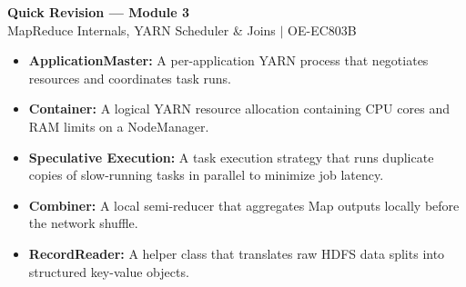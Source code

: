 \documentclass[12pt,a4paper]{article}
\begin{document}
\begin{center}
  {\large\bfseries\color{myred} Quick Revision --- Module 3}\\[3pt]
  {\small\color{mydark} MapReduce Internals, YARN Scheduler \& Joins $|$ OE-EC803B}
\end{center}
\noindent{\color{myred}\rule{\linewidth}{1.2pt}}
\vspace{8pt}

\begin{tcolorbox}[defbox, title={\textbf{One-Line Definitions}}]
\begin{itemize}[leftmargin=*, itemsep=3pt, topsep=0pt]
  \item \textbf{ApplicationMaster:} A per-application YARN process that negotiates resources and coordinates task runs.
  \item \textbf{Container:} A logical YARN resource allocation containing CPU cores and RAM limits on a NodeManager.
  \item \textbf{Speculative Execution:} A task execution strategy that runs duplicate copies of slow-running tasks in parallel to minimize job latency.
  \item \textbf{Combiner:} A local semi-reducer that aggregates Map outputs locally before the network shuffle.
  \item \textbf{RecordReader:} A helper class that translates raw HDFS data splits into structured key-value objects.
\end{itemize}
\end{tcolorbox}

\vspace{6pt}
\end{document}
